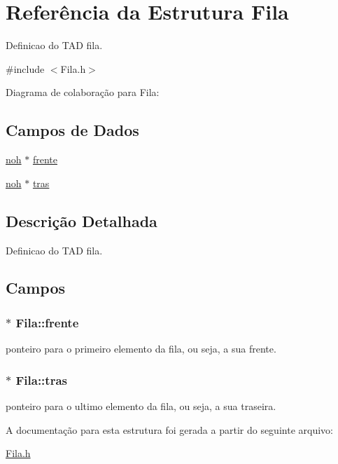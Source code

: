\hypertarget{structFila}{\section{Referência da Estrutura Fila}
\label{structFila}
}


Definicao do T\+A\+D fila.  




{\ttfamily \#include $<$Fila.\+h$>$}



Diagrama de colaboração para Fila\+:
\subsection*{Campos de Dados}
\begin{DoxyCompactItemize}
\item 
\hyperlink{Fila_8h_a0d7ef1758ed4704552e1e2020f126654}{noh} $\ast$ \hyperlink{structFila_a999b2ea3af127773ba9b02740943301a}{frente}
\item 
\hyperlink{Fila_8h_a0d7ef1758ed4704552e1e2020f126654}{noh} $\ast$ \hyperlink{structFila_a78cda3141d129d10c46d5c2871b3c902}{tras}
\end{DoxyCompactItemize}


\subsection{Descrição Detalhada}
Definicao do T\+A\+D fila. 

\subsection{Campos}
\hypertarget{structFila_a999b2ea3af127773ba9b02740943301a}{
\subsubsection[{frente}]{$\ast$ Fila\+::frente}}\label{structFila_a999b2ea3af127773ba9b02740943301a}
ponteiro para o primeiro elemento da fila, ou seja, a sua frente. \hypertarget{structFila_a78cda3141d129d10c46d5c2871b3c902}{
\subsubsection[{tras}]{$\ast$ Fila\+::tras}}\label{structFila_a78cda3141d129d10c46d5c2871b3c902}
ponteiro para o ultimo elemento da fila, ou seja, a sua traseira. 

A documentação para esta estrutura foi gerada a partir do seguinte arquivo\+:\begin{DoxyCompactItemize}
\item 
\hyperlink{Fila_8h}{Fila.\+h}\end{DoxyCompactItemize}
